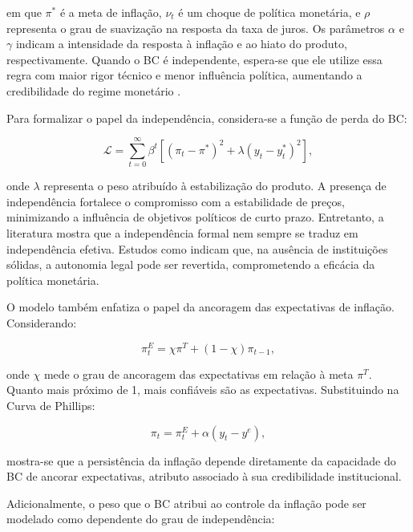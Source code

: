 \documentclass[a4paper,12pt]{article}
\begin{document}
\noindent em que $\pi^*$ é a meta de inflação, $\nu_t$ é um choque de política monetária, e $\rho$ representa o grau de suavização na resposta da taxa de juros. Os parâmetros $\alpha$ e $\gamma$ indicam a intensidade da resposta à inflação e ao hiato do produto, respectivamente. Quando o BC é independente, espera-se que ele utilize essa regra com maior rigor técnico e menor influência política, aumentando a credibilidade do regime monetário \cite{adrian2024, woodford2003, unsal2023, gali2015}.

Para formalizar o papel da independência, considera-se a função de perda do BC:

\begin{equation}
\mathcal{L} = \sum_{t=0}^{\infty} \beta^t \left[ (\pi_t - \pi^*)^2 + \lambda (y_t - y_t^*)^2 \right],
\label{eq:loss_function}
\end{equation}

\noindent onde $\lambda$ representa o peso atribuído à estabilização do produto. A presença de independência fortalece o compromisso com a estabilidade de preços, minimizando a influência de objetivos políticos de curto prazo. Entretanto, a literatura mostra que a independência formal nem sempre se traduz em independência efetiva. Estudos como \cite{jacome2022, acemoglu2008} indicam que, na ausência de instituições sólidas, a autonomia legal pode ser revertida, comprometendo a eficácia da política monetária.

O modelo também enfatiza o papel da ancoragem das expectativas de inflação. Considerando:

\begin{equation}
\pi_t^E = \chi \pi^T + (1 - \chi)\pi_{t-1},
\label{eq:expectations}
\end{equation}

\noindent onde $\chi$ mede o grau de ancoragem das expectativas em relação à meta $\pi^T$. Quanto mais próximo de 1, mais confiáveis são as expectativas. Substituindo na Curva de Phillips:

\begin{equation}
\pi_t = \pi_t^E + \alpha (y_t - y^e),
\label{eq:anchored_phillips}
\end{equation}

\noindent mostra-se que a persistência da inflação depende diretamente da capacidade do BC de ancorar expectativas, atributo associado à sua credibilidade institucional.

Adicionalmente, o peso que o BC atribui ao controle da inflação pode ser modelado como dependente do grau de independência:
\end{document}
